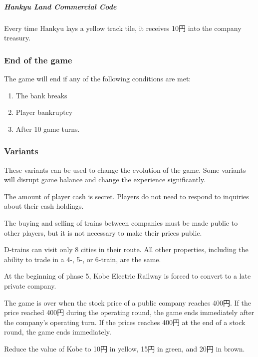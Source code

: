 \begin{multicols}{2}
\begin{description}
\subparagraph{Hankyu Land Commercial Code}
Every time Hankyu lays a yellow track tile, it receives 10円 into the
company treasury.

\end{description}

\subsubsection{End of the game}

The game will end if any of the following conditions are met:
\begin{enumerate}
\item The bank breaks

\item Player bankruptcy

\item After 10 game turns.
\end{enumerate}

\subsubsection{Variants}
These variants can be used to change the evolution of the game. Some
variants will disrupt game balance and change the experience
significantly.

The amount of player cash is secret. Players do not need to respond to
inquiries about their cash holdings.

The buying and selling of trains between companies must be made public
to other players, but it is not necessary to make their prices public.

D-trains can visit only 8 cities in their route. All other properties,
including the ability to trade in a 4-, 5-, or 6-train, are the same.

At the beginning of phase 5, Kobe Electric Railway is forced to
convert to a late private company.

The game is over when the stock price of a public company reaches 400円.
If the price reached 400円 during the operating round, the game ends
immediately after the company's operating turn. If the prices reaches
400円 at the end of a stock round, the game ends immediately.

Reduce the value of Kobe to 10円 in yellow, 15円 in green, and 20円 in brown.


\end{multicols}
